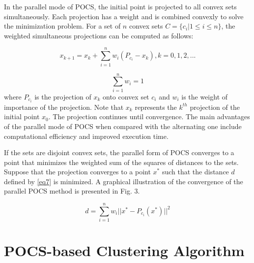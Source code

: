 \documentclass[conference]{IEEEtran}
\begin{document}
In the parallel mode of POCS, the initial point is projected to all convex sets simultaneously. Each projection has a weight and is combined convexly to solve the minimization problem. For a set of $n$ convex sets $C = \{ c_i | 1 \leq i \leq n \}$, the weighted simultaneous projections can be computed as follows:

\begin{equation}
x_{k+1} = x_k + \sum_{i=1}^{n} w_i (P_{c_i} - x_k) , k=0,1,2,... \label{eq5}
\end{equation} 

\begin{equation}
\sum_{i=1}^{n} w_i = 1 \label{eq6}
\end{equation} where $P_{c_i}$ is the projection of $x_k$ onto convex set $c_i$ and $w_i$ is the weight of importance of the projection. Note that $x_k$ represents the $k^{th}$ projection of the initial point $x_0$. The projection continues until convergence. The main advantages of the parallel mode of POCS when compared with the alternating one include computational efficiency and improved execution time.

If the sets are disjoint convex sets, the parallel form of POCS converges to a point that minimizes the weighted sum of the squares of distances to the sets. Suppose that the projection converges to a point $x^{*}$ such that the distance $d$ defined by \eqref{eq7} is minimized. A graphical illustration of the convergence of the parallel POCS method is presented in Fig. 3.


\begin{equation}
d = \sum_{i=1}^{n} w_i || x^{*} -  P_{c_i}(x^{*}) ||^2   \label{eq7}
\end{equation}


\section{POCS-based Clustering Algorithm}

\end{document}
